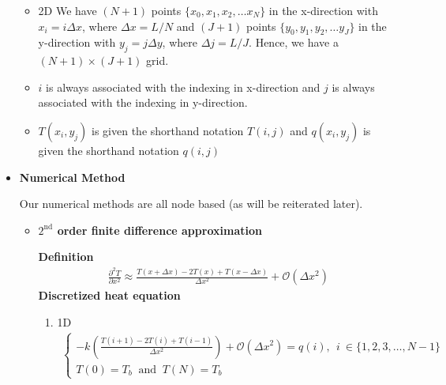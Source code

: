 \documentclass[12 pt, final]{article}
\begin{document}
\begin{itemize}
\begin{itemize}
            \item 2D We have $(N+1)$ points $\{x_0,x_1,x_2,\hdots x_N\}$ in the x-direction with $x_i=i\Delta x$, where $\Delta x = L/N$ and $(J+1)$ points $\{y_0,y_1,y_2,\hdots y_J\}$ in the y-direction with $y_j=j\Delta y$, where $\Delta j = L/J$. Hence, we have a $(N+1) \times (J+1)$ grid. 
            
            \item $i$ is always associated with the indexing in x-direction and $j$ is always associated with the indexing in y-direction.
            
            \item $T(x_i,y_j)$ is given the shorthand notation $T(i,j)$ and $q(x_i,y_j)$ is given the shorthand notation $q(i,j)$
        \end{itemize}
    \item \textbf{Numerical Method}
    
        Our numerical methods are all node based (as will be reiterated later).
        \begin{itemize}
            \item \textbf{$2^{\text{nd}}$ order finite difference approximation}
            
            \textbf{Definition}
            \begin{align*}
                \frac{\partial^2 T}{\partial x^2} \approx \frac{T(x+\Delta x)-2T(x)+T(x-\Delta x)}{\Delta x^2} + \mathcal{O}(\Delta x^2)
            \end{align*}
            \textbf{Discretized heat equation}
            \begin{enumerate}
            
                \item 1D
                \begin{align}
                \begin{cases}    -k\left(\frac{T(i+1)-2T(i)+T(i-1)}{\Delta x^2}\right) + \mathcal{O}(\Delta x^2) = q(i), \:\: i \:\in \{1,2,3,\hdots, N-1\}\\
                    T(0) = T_b \:\text{ and }\: T(N) = T_b \label{eq2}
                \end{cases}
                \end{align}
                

\end{enumerate}
\end{itemize}
\end{itemize}
\end{document}
